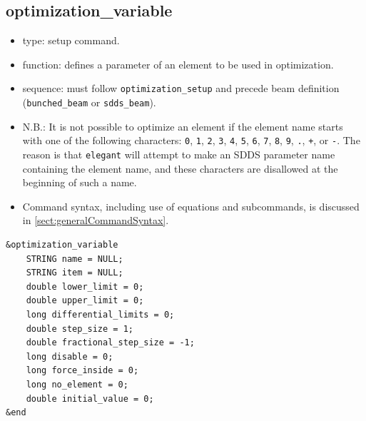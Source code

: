 \documentclass[11pt]{article}
\begin{document}
\subsection{optimization\_variable \label{subsec:optimizationvariable}}

\begin{itemize}
\item type: setup command.
\item function: defines a parameter of an element to be used in optimization.
\item sequence: must follow \verb|optimization_setup| and precede beam definition (\verb|bunched_beam| or \verb|sdds_beam|).
\item N.B.: It is not possible to optimize an element if the element name starts with one of the following
characters: 
\verb|0|, \verb|1|, \verb|2|, \verb|3|, \verb|4|, \verb|5|, \verb|6|, \verb|7|, \verb|8|,
\verb|9|, \verb|.|, \verb|+|, or \verb|-|.  The reason is that {\tt elegant} will attempt to 
make an SDDS parameter name containing the element name, and these characters are disallowed
at the beginning of such a name.
\item Command syntax, including use of equations and subcommands, is discussed in \ref{sect:generalCommandSyntax}.
\end{itemize}

\begin{verbatim}
&optimization_variable
    STRING name = NULL;
    STRING item = NULL;
    double lower_limit = 0;
    double upper_limit = 0;
    long differential_limits = 0;
    double step_size = 1;
    double fractional_step_size = -1;
    long disable = 0;
    long force_inside = 0;
    long no_element = 0;
    double initial_value = 0;
&end
\end{verbatim}
\end{document}
